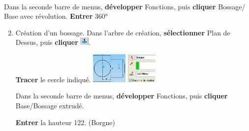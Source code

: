 ~\

Dans la seconde barre de menus, \textbf{développer} Fonctions, puis \textbf{cliquer} Bossage/ Base avec révolution. 
\textbf{Entrer} 360° 

\begin{enumerate}
\setcounter{enumi}{1}
 \item  Création d'un bossage. 
Dans l'arbre de création, \textbf{sélectionner} Plan de Dessus, puis \textbf{cliquer} \includegraphics[height=0.4cm]{img/SW-020.png}.

\textbf{Tracer} le cercle indiqué.
 \includegraphics[height=1.5cm]{img/SW-021.png} 
 \includegraphics[height=1.5cm]{img/SW-022.png}

Dans la seconde barre de menus, \textbf{développer} Fonctions, puis \textbf{cliquer} Base/Bossage extrudé.

\textbf{Entrer} la hauteur 122. (Borgne)
\end{enumerate}

